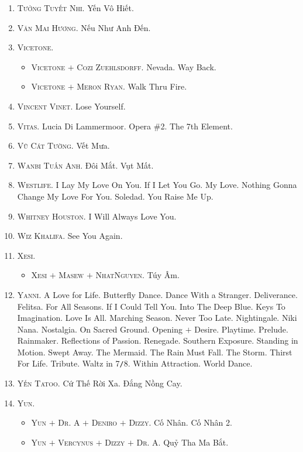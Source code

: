 \documentclass[oneside]{book}
\numberwithin{equation}{section}
\begin{document}
\begin{enumerate}
	\item \textsc{Tưởng Tuyết Nhi.} Yến Vô Hiết.
	\item \textsc{Văn Mai Hương.} Nếu Như Anh Đến.
	\item \textsc{Vicetone.}
	\begin{itemize}
		\item \textsc{Vicetone $+$ Cozi Zuehlsdorff.} Nevada. Way Back.
		\item \textsc{Vicetone $+$ Meron Ryan.} Walk Thru Fire.
	\end{itemize}
	\item \textsc{Vincent Vinet.} Lose Yourself.
	\item \textsc{Vitas.} Lucia Di Lammermoor. Opera \#2. The 7th Element.
	\item \textsc{Vũ Cát Tường.} Vết Mưa.
	\item \textsc{Wanbi Tuấn Anh.} Đôi Mắt. Vụt Mất.
	\item \textsc{Westlife.} I Lay My Love On You. If I Let You Go. My Love. Nothing Gonna Change My Love For You. Soledad. You Raise Me Up.
	\item \textsc{Whitney Houston.} I Will Always Love You.
	\item \textsc{Wiz Khalifa.} See You Again.
	\item \textsc{Xesi.}
	\begin{itemize}
		\item \textsc{Xesi $+$ Masew $+$ NhatNguyen.} Túy Âm.
	\end{itemize}
	\item \textsc{Yanni.} A Love for Life. Butterfly Dance. Dance With a Stranger. Deliverance. Felitsa. For All Seasons. If I Could Tell You. Into The Deep Blue. Keys To Imagination. Love Is All. Marching Season. Never Too Late. Nightingale. Niki Nana. Nostalgia. On Sacred Ground. Opening $+$ Desire. Playtime. Prelude. Rainmaker. Reflections of Passion. Renegade. Southern Exposure. Standing in Motion. Swept Away. The Mermaid. The Rain Must Fall. The Storm. Thirst For Life. Tribute. Waltz in 7\texttt{/}8. Within Attraction. World Dance.
	\item \textsc{Yến Tatoo.} Cứ Thế Rời Xa. Đắng Nồng Cay.
	\item \textsc{Yun.}
	\begin{itemize}
		\item \textsc{Yun $+$ Dr. A $+$ Deniro $+$ Dizzy.} Cố Nhân. Cố Nhân 2.
		\item \textsc{Yun $+$ Vercynus $+$ Dizzy $+$ Dr. A.} Quỷ Tha Ma Bắt.
	\end{itemize}

\end{enumerate}
\end{document}
